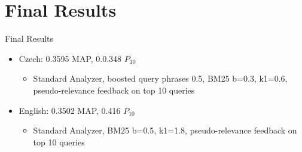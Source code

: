 \documentclass{beamer}
\begin{document}
\section{Final Results}

\begin{frame}{Final Results}

\begin{itemize}
	\item Czech: 0.3595 MAP, 0.0.348 $P_{10}$
		\begin{itemize}
			\item Standard Analyzer, boosted query phrases 0.5, BM25 b=0.3, k1=0.6,
				pseudo-relevance feedback on top 10 queries
		\end{itemize}
	\item English: 0.3502 MAP, 0.416 $P_{10}$
		\begin{itemize}
			\item Standard Analyzer, BM25 b=0.5, k1=1.8,
				pseudo-relevance feedback on top 10 queries
		\end{itemize}
\end{itemize}

\end{frame}
\end{document}
